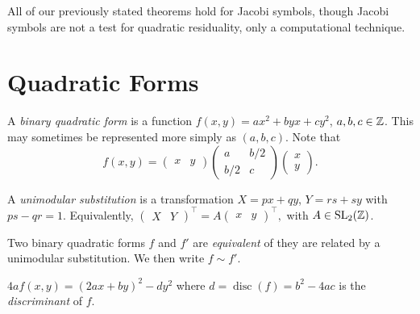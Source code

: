 \documentclass[a4paper, 10pt]{amsart}
\begin{document}
\begin{remark}
    All of our previously stated theorems hold for Jacobi symbols, though Jacobi symbols are not a test for quadratic residuality, only a computational technique. 
\end{remark}

\section{Quadratic Forms}

\begin{definition}
    A \emph{binary quadratic form} is a function $f(x, y) = ax^2 + byx + cy^2$, $a, b, c \in \mathbb{Z}$. This may sometimes be represented more simply as $(a, b, c)$. Note that
    $$
    f(x, y) = 
    \begin{pmatrix}
        x & y
    \end{pmatrix}
    \begin{pmatrix}
        a & b/2 \\ b/2 & c
    \end{pmatrix} 
    \begin{pmatrix}
        x \\ y
    \end{pmatrix}.
    $$
\end{definition}

\begin{definition}
    A \emph{unimodular substitution} is a transformation $X = px + qy$, $Y = rs + sy$ with $ps - qr = 1$. Equivalently, $\begin{pmatrix}
        X & Y
    \end{pmatrix}^\intercal = A \begin{pmatrix}
        x & y
    \end{pmatrix}^\intercal,$ with $A \in \operatorname{SL}_2(\mathbb{Z})$.
\end{definition}

\begin{definition}
    Two binary quadratic forms $f$ and $f'$ are \emph{equivalent} of they are related by a unimodular substitution. We then write $f \sim f'$.
\end{definition}

\begin{definition}
    $4a f(x, y) = (2ax + by)^2 - dy^2$ where $d = \operatorname{disc}(f) = b^2 - 4ac$ is the \emph{discriminant} of $f$.
\end{definition}
\end{document}
